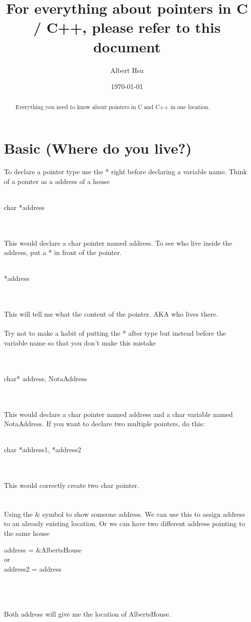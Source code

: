 \documentclass[a4paper]{article}
\title{For everything about pointers in C / C++, please refer to this document}
\author{Albert Hsu}
\date{\today}
\begin{document}
\maketitle

\begin{abstract}
Everything you need to know about pointers in C and C++ in one location. 
\end{abstract}
\section{Basic (Where do you live?)}
 To declare a pointer type use the * right before declaring a variable name. Think of a pointer as a address of a house\\
 \\
 	\centerline{char *address}\\
\\
This would declare a char pointer named address. To see who live inside the address, put a * in front of the pointer.  \\
\\
\centerline{*address} \\
\\
This will tell me what the content of the pointer. AKA who lives there. 
\\
\\
Try not to make a habit of putting the * after type but instead before the variable name so that you don't make this mistake 
\\\\
\\
	\centerline{char* address, NotaAddress}\\
\\
This would declare a char pointer named address and a char variable named NotaAddress. If you want to declare two multiple pointers, do this:
\\
\\
\centerline{char *address1, *address2}\\
\\
This would correctly create two char pointer. 
\\
\\
\\
Using the \& symbol to show someone address. We can use this to assign address to an already existing location. Or we can have two different address pointing to the same house
\\
\centerline{address = \&AlbertsHouse\\ or\\ address2 = address}\\
\\ \\ Both address will give me the location of AlbertsHouse. 
\end{document}
